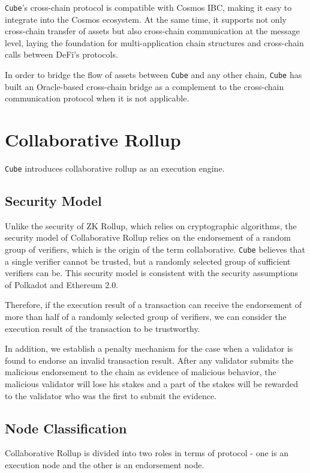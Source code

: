 \documentclass{iacrtrans}
\begin{document}
\texttt{Cube}'s cross-chain protocol is compatible with Cosmos IBC, making it easy to integrate into the Cosmos ecosystem. At the same time, it supports not only cross-chain transfer of assets but also cross-chain communication at the message level, laying the foundation for multi-application chain structures and cross-chain calls between DeFi's protocols.

In order to bridge the flow of assets between \texttt{Cube} and any other chain, \texttt{Cube} has built an Oracle-based cross-chain bridge as a complement to the cross-chain communication protocol when it is not applicable.


\section{Collaborative Rollup}
\texttt{Cube} introduces collaborative rollup as an execution engine.

\subsection{Security Model}
Unlike the security of ZK Rollup, which relies on cryptographic algorithms, the security model of Collaborative Rollup relies on the endorsement of a random group of verifiers, which is the origin of the term collaborative. \texttt{Cube} believes that a single verifier cannot be trusted, but a randomly selected group of sufficient verifiers can be. This security model is consistent with the security assumptions of Polkadot and Ethereum 2.0. 

Therefore, if the execution result of a transaction can receive the endorsement of more than half of a randomly selected group of verifiers, we can consider the execution result of the transaction to be trustworthy.

In addition, we establish a penalty mechanism for the case when a validator is found to endorse an invalid transaction result. After any validator submits the malicious endorsement to the chain as evidence of malicious behavior, the malicious validator will lose his stakes and a part of the stakes will be rewarded to the validator who was the first to submit the evidence.


\subsection{Node Classification}
Collaborative Rollup is divided into two roles in terms of protocol - one is an execution node and the other is an endorsement node.
\end{document}
